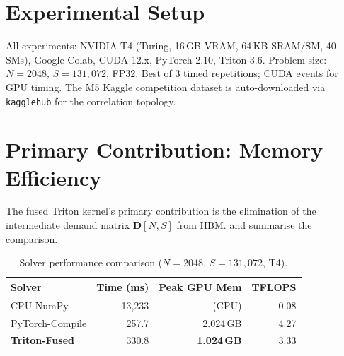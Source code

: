 \section{Experimental Setup}

All experiments: NVIDIA T4 (Turing, 16\,GB VRAM, 64\,KB SRAM/SM, 40 SMs), Google Colab, CUDA 12.x, PyTorch 2.10, Triton 3.6. Problem size: $N{=}2048$, $S{=}131{,}072$, FP32. Best of 3 timed repetitions; CUDA events for GPU timing. The M5 Kaggle competition dataset is auto-downloaded via \texttt{kagglehub} for the correlation topology.

\section{Primary Contribution: Memory Efficiency}

The fused Triton kernel's primary contribution is the elimination of the intermediate demand matrix $\mathbf{D}[N,S]$ from HBM.  and  summarise the comparison.

\begin{table}[H]
\centering\small
\caption{Solver performance comparison ($N{=}2048$, $S{=}131{,}072$, T4).}
\label{tab:perf}
\begin{tabular}{@{} l r r r @{}}
    \toprule
    \textbf{Solver} & \textbf{Time (ms)} & \textbf{Peak GPU Mem} & \textbf{TFLOPS} \\
    \midrule
    CPU-NumPy            & 13{,}233 & --- (CPU)     & 0.08 \\
    PyTorch-Compile      & 257.7     & 2.024\,GB & 4.27 \\
    \textbf{Triton-Fused} & 330.8 & \textbf{1.024\,GB} & 3.33 \\
    \bottomrule
\end{tabular}
\end{table}


